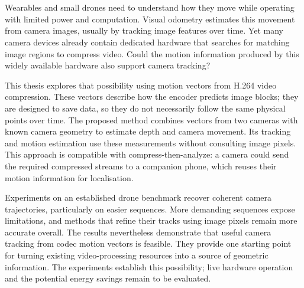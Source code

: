 \chapter{\abstractname}

Wearables and small drones need to understand how they move while operating
with limited power and computation. Visual odometry estimates this movement
from camera images, usually by tracking image features over time. Yet many
camera devices already contain dedicated hardware that searches for matching
image regions to compress video. Could the motion information produced by
this widely available hardware also support camera tracking?

This thesis explores that possibility using motion vectors from H.264 video
compression. These vectors describe how the encoder predicts image blocks;
they are designed to save data, so they do not necessarily follow the same
physical points over time. The proposed method combines vectors from two
cameras with known camera geometry to estimate depth and camera movement.
Its tracking and motion estimation use these measurements without consulting
image pixels. This approach is compatible with compress-then-analyze: a
camera could send the required compressed streams to a companion phone,
which reuses their motion information for localisation.

Experiments on an established drone benchmark recover coherent camera
trajectories, particularly on easier sequences. More demanding sequences
expose limitations, and methods that refine their tracks using image pixels
remain more accurate overall. The results nevertheless demonstrate that
useful camera tracking from codec motion vectors is feasible. They provide
one starting point for turning existing video-processing resources into a
source of geometric information. The experiments establish this possibility;
live hardware operation and the potential energy savings remain to be
evaluated.


\makeatletter
{}
{\renewcommand{\abstractname}{Kurzfassung}}
{\renewcommand{\abstractname}{Abstract}}
\makeatother

\chapter{\abstractname}

